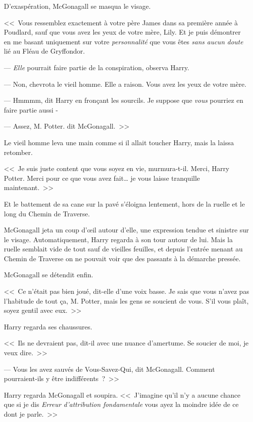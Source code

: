 D'exaspération, McGonagall se masqua le visage. 

<<~Vous ressemblez exactement à votre père James dans sa première année à Poudlard, sauf que vous avez les yeux de votre mère, Lily. Et je puis démontrer en me basant uniquement sur votre \emph{personnalité} que vous êtes \emph{sans aucun doute} lié au Fléau de Gryffondor.

--- \emph{Elle} pourrait faire partie de la conspiration, observa Harry.

--- Non, chevrota le vieil homme. Elle a raison. Vous avez les yeux de votre mère.

--- Hmmmm, dit Harry en fronçant les sourcils. Je suppose que \emph{vous} pourriez en faire partie aussi -

--- Assez, M. Potter. dit McGonagall.~>>

Le vieil homme leva une main comme si il allait toucher Harry, mais la laissa retomber.

<<~Je suis juste content que vous soyez en vie, murmura-t-il. Merci, Harry Potter. Merci pour ce que vous avez fait… je vous laisse tranquille maintenant.~>>

Et le battement de sa cane sur la pavé s'éloigna lentement, hors de la ruelle et le long du Chemin de Traverse.

McGonagall jeta un coup d'œil autour d'elle, une expression tendue et sinistre sur le visage. Automatiquement, Harry regarda à son tour autour de lui. Mais la ruelle semblait vide de tout sauf de vieilles feuilles, et depuis l'entrée menant au Chemin de Traverse on ne pouvait voir que des passants à la démarche pressée.

McGonagall se détendit enfin.

<<~Ce n'était pas bien joué, dit-elle d'une voix basse. Je sais que vous n'avez pas l'habitude de tout ça, M. Potter, mais les gens se soucient de vous. S'il vous plaît, soyez gentil avec eux.~>>

Harry regarda ses chaussures.

<<~Ils ne devraient pas, dit-il avec une nuance d'amertume. Se soucier de moi, je veux dire.~>>

--- Vous les avez sauvés de Vous-Savez-Qui, dit McGonagall. Comment pourraient-ils y être indifférents~?~>>

Harry regarda McGonagall et soupira. <<~J'imagine qu'il n'y a aucune chance que si je dis \emph{Erreur d'attribution fondamentale} vous ayez la moindre idée de ce dont je parle.~>>

